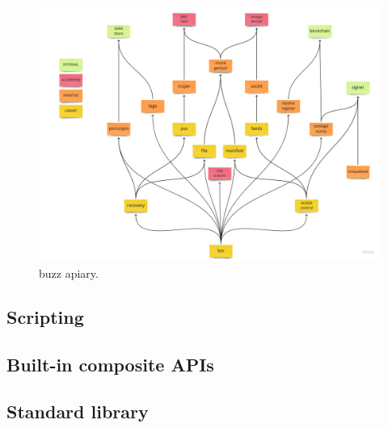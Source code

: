 \begin{figure}[htbp]
   \centering
   \includegraphics[width=\textwidth]{fig/bzz-apiary.pdf}
   \caption[buzz apiary \statusgreen]{buzz apiary. }
   \label{fig:buzz-apiary}
\end{figure}

\subsection{Scripting \statusred}
\label{sec:buzz}

\subsection{Built-in composite APIs \statusred}
\label{sec:lego}

\subsection{Standard library \statusred}
\label{sec:stdlib}